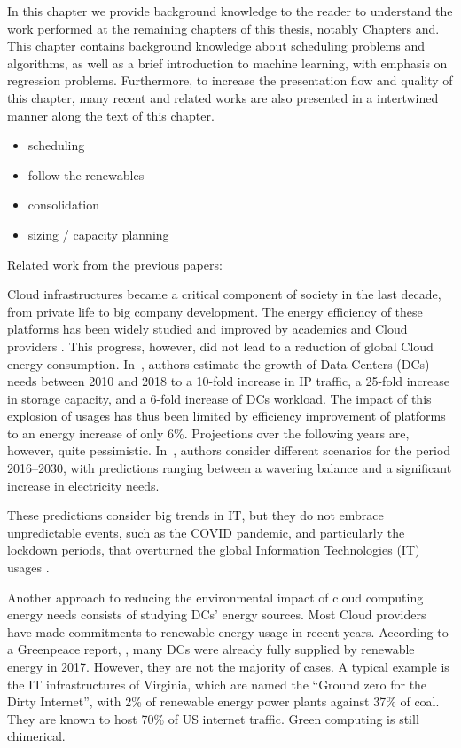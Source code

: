 In this chapter we provide background knowledge to the reader to understand the work performed at the remaining chapters of this thesis, notably Chapters and. This chapter contains background knowledge about scheduling problems and algorithms, as well as a brief introduction to machine learning, with emphasis on regression problems. Furthermore, to increase the presentation flow and quality of this chapter, many recent and related works are also presented in a intertwined manner along the text of this chapter.

\begin{itemize}
    \item scheduling
    \item follow the renewables
    \item consolidation
    \item sizing / capacity planning
\end{itemize}



Related work from the previous papers:



Cloud infrastructures became a critical component of society in the
last decade, from private life to big company development. The energy
efficiency of these platforms has been widely studied and improved by
academics and Cloud providers \cite{muralidhar2020energy}. This
progress, however, did not lead to a reduction of global Cloud energy
consumption. In~\cite{masanet2020recalibrating}, authors estimate the
growth of Data Centers (DCs) needs between 2010 and 2018 to a 10-fold
increase in IP traffic, a 25-fold increase in storage capacity, and a
6-fold increase of DCs workload. The impact of this explosion of
usages has thus been limited by efficiency improvement of platforms to
an energy increase of only 6\%. Projections over the following years
are, however, quite pessimistic. In~\cite{koot2021usage}, authors
consider different scenarios for the period 2016--2030, with
predictions ranging between a wavering balance and a significant
increase in electricity needs.


These predictions consider big trends in IT, but they do not embrace
unpredictable events, such as the COVID pandemic, and particularly the
lockdown periods, that overturned the global Information Technologies
(IT) usages \cite{feldmann2021implications}.


Another approach to reducing the environmental impact of cloud
computing energy needs consists of studying DCs' energy sources. Most
Cloud providers have made commitments to renewable energy usage in
recent years. According to a Greenpeace report, \cite{greenpeace2017},
many DCs were already fully supplied by renewable energy in
2017. However, they are not the majority of cases. A typical example
is the IT infrastructures of Virginia, which are named the ``Ground
zero for the Dirty Internet'', with 2\% of renewable energy power
plants against 37\% of coal. They are known to host 70\% of US
internet traffic. Green computing is still chimerical.


